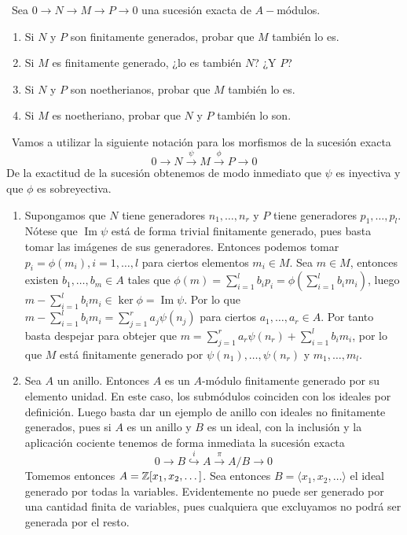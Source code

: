 \documentclass[twoside]{article}
\DeclareMathOperator{\Ima}{Im}
\begin{document}
\newpage
\begin{ejercicio}{3}\
Sea $0 \to N \to M \to P \to 0$ una sucesión exacta de $A-$módulos.
\begin{enumerate}
\item Si $N$ y $P$ son finitamente generados, probar que $M$ también lo es.
\item Si $M$ es finitamente generado, ¿lo es también $N$? ¿Y $P$?
\item Si $N$ y $P$ son noetherianos, probar que $M$ también lo es.
\item Si $M$ es noetheriano, probar que $N$ y $P$ también lo son.
\end{enumerate}
\end{ejercicio}
\begin{solucion}\
Vamos a utilizar la siguiente notación para los morfismos de la sucesión exacta $$0\to N  \overset{\psi}{\to} M  \overset{\phi}{\to} P \to 0$$ De la exactitud de la sucesión obtenemos de modo inmediato que $\psi$ es inyectiva y que $\phi$ es sobreyectiva. 
\begin{enumerate}
\item Supongamos que $N$ tiene generadores $n_1,\dots, n_r$ y $P$ tiene generadores $p_1,\dots, p_l$. Nótese que $\Ima\psi$ está de forma trivial finitamente generado, pues basta tomar las imágenes de sus generadores. Entonces podemos tomar $p_i=\phi(m_i), i=1,\dots, l$ para ciertos elementos $m_i\in M$. Sea $m\in M$, entonces existen $b_1,\dots, b_m\in A$ tales que $\phi(m)=\sum_{i=1}^lb_ip_i=\phi\left(\sum_{i=1}^lb_im_i\right)$, luego $m-\sum_{i=1}^lb_im_i\in\ker\phi=\Ima\psi$. Por lo que $m-\sum_{i=1}^lb_im_i=\sum_{j=1}^r a_j\psi(n_j)$ para ciertos $a_1,\dots,a_r\in A$. Por tanto basta despejar para obtejer que $m=\sum_{j=1}^r a_r\psi(n_r)+\sum_{i=1}^lb_im_i$, por lo que $M$ está finitamente generado por $\psi(n_1),\dots, \psi(n_r)$ y $m_1,\dots, m_l$.

\item Sea $A$ un anillo. Entonces $A$ es un $A$-módulo finitamente generado por su elemento unidad. En este caso, los submódulos coinciden con los ideales por definición. Luego basta dar un ejemplo de anillo con ideales no finitamente generados, pues si $A$ es un anillo y $B$ es un ideal, con la inclusión y la aplicación cociente tenemos de forma inmediata la sucesión exacta
$$0\to B \overset{i}{\hookrightarrow} A\overset{\pi}{\to} A/B\to 0$$
Tomemos entonces $A=\mathbb{Z}[x_1,x_2,\dots]$. Sea entonces $B=\langle x_1,x_2,\dots  \rangle$ el ideal generado por todas la variables. Evidentemente no puede ser generado por una cantidad finita de variables, pues cualquiera que excluyamos no podrá ser generada por el resto. 


\end{enumerate}
\end{solucion}
\end{document}
